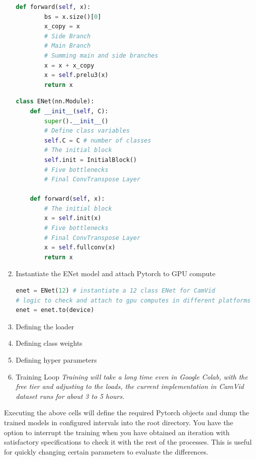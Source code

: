 \begin{enumerate}
\begin{lstlisting}[language=Python]
    def forward(self, x):
        bs = x.size()[0]
        x_copy = x
        # Side Branch
        # Main Branch
        # Summing main and side branches
        x = x + x_copy
        x = self.prelu3(x)
        return x
        \end{lstlisting}

          \begin{lstlisting}[language=Python]
class ENet(nn.Module):
    def __init__(self, C):
        super().__init__()
        # Define class variables
        self.C = C # number of classes
        # The initial block
        self.init = InitialBlock()
        # Five bottlenecks
        # Final ConvTranspose Layer

    def forward(self, x):
        # The initial block
        x = self.init(x)
        # Five bottlenecks
        # Final ConvTranspose Layer
        x = self.fullconv(x)
        return x
        \end{lstlisting}
    \item Instantiate the ENet model and attach Pytorch to GPU compute \textit{}
          \begin{lstlisting}[language=Python]
enet = ENet(12) # instantiate a 12 class ENet for CamVid
# logic to check and attach to gpu computes in different platforms
enet = enet.to(device)
        \end{lstlisting}
    \item Defining the loader
    \item Defining class weights
    \item Defining hyper parameters
    \item Training Loop
          \textit{Training will take a long time even in Google Colab, with the free tier and adjusting to the loads, the current implementation in CamVid dataset runs for about 3 to 5 hours.}
\end{enumerate}
Executing the above cells will define the required Pytorch objects and dump the trained models in configured intervals into the root directory. You have the option to interrupt the training when you have obtained an iteration with satisfactory specifications to check it with the rest of the processes. This is useful for quickly changing certain parameters to evaluate the differences.

